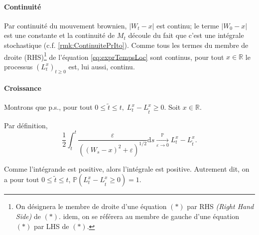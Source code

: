 \documentclass[openany]{book}
\makeatletter
\renewcommand{\P}{\mathds{P}}
\newcommand{\R}{\mathbb{R}}
\newcommand{\1}{\mathbbm{1}}
\newcommand{\sign}{\text{sign}}
\renewcommand{\d}{\mathrm{d}}
\renewenvironment{proof}[1][\textbf{\textit{Démonstration}}]{%
  \par\pushQED{\qed}%
  \normalfont\topsep6\p@\@plus6\p@\relax
  \trivlist\item[\hskip\labelsep
    #1\@addpunct{.}]\ignorespaces
}{%
  \popQED\endtrivlist\@endpefalse
}
\theoremstyle{thmfont}
\theoremstyle{deffont}
\theoremstyle{thmfont}
\theoremstyle{deffont}
\makeatother
\begin{document}
\begin{proof}
\paragraph{Continuité} Par continuité du mouvement brownien, $|W_t - x|$ est continu; le terme $|W_0 - x|$ est une constante et la continuité de $M_t$ découle du fait que c'est une intégrale stochastique (c.f. \autoref{rmk:ContinuitePrIto}).
Comme tous les termes du membre de droite (RHS)\footnote{On désignera le membre de droite d'une équation $(*)$ par RHS \textit{(Right Hand Side)} de $(*)$. idem, on se référera au membre de gauche d'une équation $(*)$ par LHS de $(*)$.} de l'équation \eqref{eq:exprTempsLoc} sont continus, pour tout $x \in \R$ le processus $(L_t^x)_{t\geq0}$ est, lui aussi, continu.

\paragraph{Croissance} Montrons que p.s., pour tout $0 \leq \tilde t \leq t, \; L_t^x - L_{\tilde t}^x \geq 0$. Soit $x \in \R$.

\noindent Par définition, $$\dfrac{1}{2}\int_{\tilde t}^t \dfrac{\varepsilon}{\left((W_s-x)^2 + \varepsilon \right)^{1/2}} \d s \xrightarrow[\varepsilon \to 0]{\P} L_t^x - L_{\tilde t}^x.$$

\noindent Comme l'intégrande est positive, alors l'intégrale est positive. Autrement dit, on a pour tout $0 \leq \tilde t \leq t$, $\P(L_t^x - L_{\tilde t}^x \geq 0) = 1$.\\



\end{proof}
\end{document}
